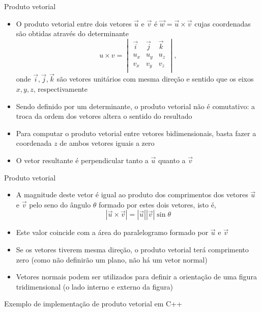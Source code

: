 \begin{frame}[fragile]{Produto vetorial}

    \begin{itemize}
        \item O produto vetorial entre dois vetores $\vec{u}$ e $\vec{v}$ é $\vec{w} = \vec{u}
        \times \vec{v}$ cujas coordenadas são obtidas através do determinante 
        \[
            u\times v = \begin{vmatrix}
                \vec{i} & \vec{j} & \vec{k} \\
                u_x & u_y & u_z \\
                v_x & v_y & v_z \\
            \end{vmatrix},
        \]
        onde $\vec{i}, \vec{j}, \vec{k}$ são vetores unitários com mesma direção e sentido que os 
        eixos $x, y, z$, respectivamente

        \item Sendo definido por um determinante, o produto vetorial não é comutativo: a troca da 
            ordem dos vetores altera o sentido do resultado

        \item Para computar o produto vetorial entre vetores bidimensionais, basta fazer a 
            coordenada $z$ de ambos vetores iguais a zero

        \item O vetor resultante é perpendicular tanto a $\vec{u}$ quanto a $\vec{v}$ 

    \end{itemize}

\end{frame}

\begin{frame}[fragile]{Produto vetorial}

    \begin{itemize}
        \item A magnitude deste vetor é igual ao produto dos comprimentos dos vetores $\vec{u}$ e 
            $\vec{v}$ pelo seno do ângulo $\theta$ formado por estes dois vetores, isto é,
        \[
            |\vec{u}\times \vec{v}| = |\vec{u}||\vec{v}|\sin \theta
        \]

        \item Este valor coincide com a área do paralelogramo formado por $\vec{u}$ e $\vec{v}$

        \item Se os vetores tiverem mesma direção, o produto vetorial terá comprimento zero (como não definirão um plano, não há um vetor normal)

        \item Vetores normais podem ser utilizados para definir a orientação de uma figura tridimensional (o lado interno e externo da figura)

    \end{itemize}

\end{frame}

\begin{frame}[fragile]{Exemplo de implementação de produto vetorial em C++}
\end{frame}
